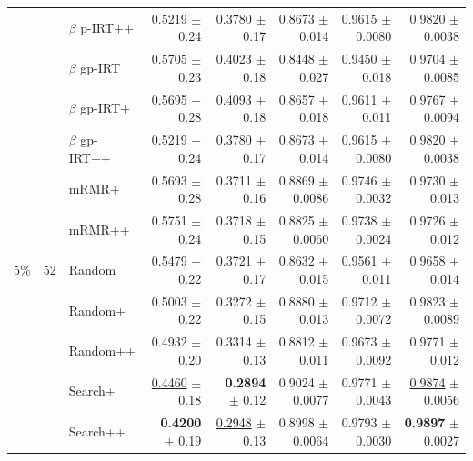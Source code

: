 \begin{longtable}{llp{}rrrrr}
 &  & $\beta$ p-IRT++ & 0.5219 {\scriptsize $\pm$ 0.24} & 0.3780 {\scriptsize $\pm$ 0.17} & 0.8673 {\scriptsize $\pm$ 0.014} & 0.9615 {\scriptsize $\pm$ 0.0080} & 0.9820 {\scriptsize $\pm$ 0.0038} \\
 &  & $\beta$ gp-IRT & 0.5705 {\scriptsize $\pm$ 0.23} & 0.4023 {\scriptsize $\pm$ 0.18} & 0.8448 {\scriptsize $\pm$ 0.027} & 0.9450 {\scriptsize $\pm$ 0.018} & 0.9704 {\scriptsize $\pm$ 0.0085} \\
 &  & $\beta$ gp-IRT+ & 0.5695 {\scriptsize $\pm$ 0.28} & 0.4093 {\scriptsize $\pm$ 0.18} & 0.8657 {\scriptsize $\pm$ 0.018} & 0.9611 {\scriptsize $\pm$ 0.011} & 0.9767 {\scriptsize $\pm$ 0.0094} \\
 &  & $\beta$ gp-IRT++ & 0.5219 {\scriptsize $\pm$ 0.24} & 0.3780 {\scriptsize $\pm$ 0.17} & 0.8673 {\scriptsize $\pm$ 0.014} & 0.9615 {\scriptsize $\pm$ 0.0080} & 0.9820 {\scriptsize $\pm$ 0.0038} \\
 &  & mRMR+ & 0.5693 {\scriptsize $\pm$ 0.28} & 0.3711 {\scriptsize $\pm$ 0.16} & 0.8869 {\scriptsize $\pm$ 0.0086} & 0.9746 {\scriptsize $\pm$ 0.0032} & 0.9730 {\scriptsize $\pm$ 0.013} \\
 &  & mRMR++ & 0.5751 {\scriptsize $\pm$ 0.24} & 0.3718 {\scriptsize $\pm$ 0.15} & 0.8825 {\scriptsize $\pm$ 0.0060} & 0.9738 {\scriptsize $\pm$ 0.0024} & 0.9726 {\scriptsize $\pm$ 0.012} \\
\midrule
5\% & 52 & Random & 0.5479 {\scriptsize $\pm$ 0.22} & 0.3721 {\scriptsize $\pm$ 0.17} & 0.8632 {\scriptsize $\pm$ 0.015} & 0.9561 {\scriptsize $\pm$ 0.011} & 0.9658 {\scriptsize $\pm$ 0.014} \\
 &  & Random+ & 0.5003 {\scriptsize $\pm$ 0.22} & 0.3272 {\scriptsize $\pm$ 0.15} & 0.8880 {\scriptsize $\pm$ 0.013} & 0.9712 {\scriptsize $\pm$ 0.0072} & 0.9823 {\scriptsize $\pm$ 0.0089} \\
 &  & Random++ & 0.4932 {\scriptsize $\pm$ 0.20} & 0.3314 {\scriptsize $\pm$ 0.13} & 0.8812 {\scriptsize $\pm$ 0.011} & 0.9673 {\scriptsize $\pm$ 0.0092} & 0.9771 {\scriptsize $\pm$ 0.012} \\
 &  & Search+ & \underline{0.4460} {\scriptsize $\pm$ 0.18} & \textbf{0.2894} {\scriptsize $\pm$ 0.12} & 0.9024 {\scriptsize $\pm$ 0.0077} & 0.9771 {\scriptsize $\pm$ 0.0043} & \underline{0.9874} {\scriptsize $\pm$ 0.0056} \\
 &  & Search++ & \textbf{0.4200} {\scriptsize $\pm$ 0.19} & \underline{0.2948} {\scriptsize $\pm$ 0.13} & 0.8998 {\scriptsize $\pm$ 0.0064} & 0.9793 {\scriptsize $\pm$ 0.0030} & \textbf{0.9897} {\scriptsize $\pm$ 0.0027} \\

\end{longtable}
